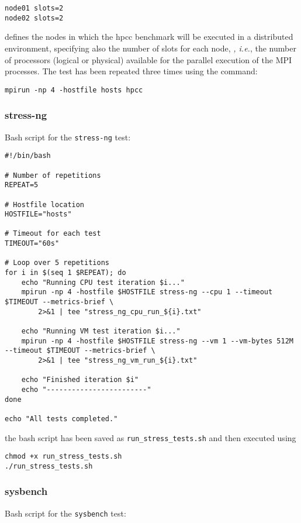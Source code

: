 \begin{verbatim}
node01 slots=2
node02 slots=2
\end{verbatim}

 defines the nodes in which the hpcc benchmark will be executed in a distributed environment, specifying also the number of slots for each node, \textit{, i.e.}, the number of processors (logical or physical) available for the parallel execution of the MPI processes. The test has been repeated three times using the command:
 
\begin{verbatim}
mpirun -np 4 -hostfile hosts hpcc
\end{verbatim}

\subsubsection{stress-ng}
Bash script for the \texttt{stress-ng} test:

\begin{verbatim}
#!/bin/bash

# Number of repetitions
REPEAT=5

# Hostfile location
HOSTFILE="hosts"

# Timeout for each test
TIMEOUT="60s"

# Loop over 5 repetitions
for i in $(seq 1 $REPEAT); do
    echo "Running CPU test iteration $i..."
    mpirun -np 4 -hostfile $HOSTFILE stress-ng --cpu 1 --timeout $TIMEOUT --metrics-brief \
        2>&1 | tee "stress_ng_cpu_run_${i}.txt"

    echo "Running VM test iteration $i..."
    mpirun -np 4 -hostfile $HOSTFILE stress-ng --vm 1 --vm-bytes 512M --timeout $TIMEOUT --metrics-brief \
        2>&1 | tee "stress_ng_vm_run_${i}.txt"
    
    echo "Finished iteration $i"
    echo "------------------------"
done

echo "All tests completed."
\end{verbatim}

the bash script has been saved as \texttt{run\_stress\_tests.sh} and then executed using

\begin{verbatim}
chmod +x run_stress_tests.sh
./run_stress_tests.sh
\end{verbatim}

\subsubsection{sysbench}
Bash script for the \texttt{sysbench} test:

